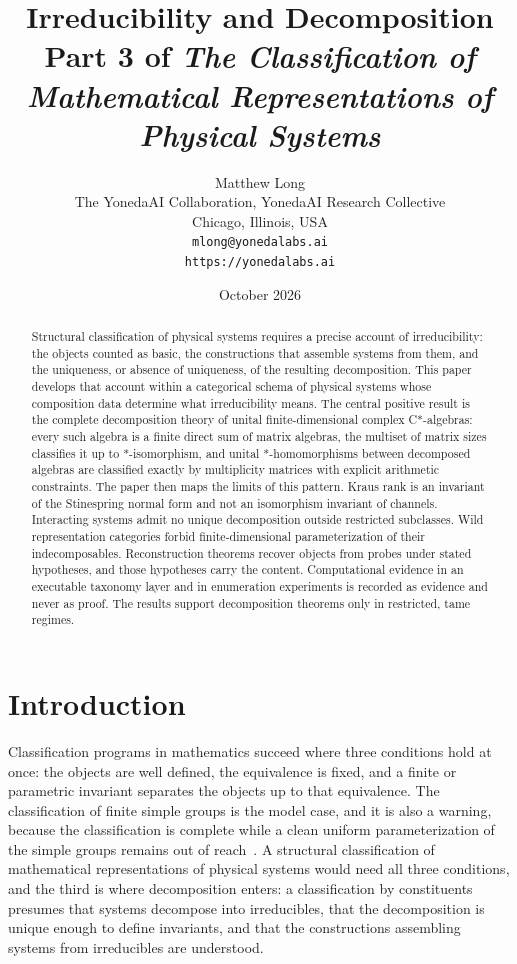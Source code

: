 \documentclass[11pt,letterpaper]{article}
\title{Irreducibility and Decomposition\\[4pt]
  {\normalsize Part 3 of \emph{The Classification of Mathematical Representations of Physical Systems}}}
\author{Matthew Long\\
  \small The YonedaAI Collaboration, YonedaAI Research Collective\\
  \small Chicago, Illinois, USA\\
  \small \texttt{mlong@yonedalabs.ai}\\
  \small \texttt{https://yonedalabs.ai}}
\date{October 2026}
\theoremstyle{definition}
\theoremstyle{remark}
\begin{document}
\maketitle

\begin{abstract}
Structural classification of physical systems requires a precise account of irreducibility: the objects counted as basic, the constructions that assemble systems from them, and the uniqueness, or absence of uniqueness, of the resulting decomposition. This paper develops that account within a categorical schema of physical systems whose composition data determine what irreducibility means. The central positive result is the complete decomposition theory of unital finite-dimensional complex C*-algebras: every such algebra is a finite direct sum of matrix algebras, the multiset of matrix sizes classifies it up to *-isomorphism, and unital *-homomorphisms between decomposed algebras are classified exactly by multiplicity matrices with explicit arithmetic constraints. The paper then maps the limits of this pattern. Kraus rank is an invariant of the Stinespring normal form and not an isomorphism invariant of channels. Interacting systems admit no unique decomposition outside restricted subclasses. Wild representation categories forbid finite-dimensional parameterization of their indecomposables. Reconstruction theorems recover objects from probes under stated hypotheses, and those hypotheses carry the content. Computational evidence in an executable taxonomy layer and in enumeration experiments is recorded as evidence and never as proof. The results support decomposition theorems only in restricted, tame regimes.
\end{abstract}

\section{Introduction}

Classification programs in mathematics succeed where three conditions hold at once: the objects are well defined, the equivalence is fixed, and a finite or parametric invariant separates the objects up to that equivalence. The classification of finite simple groups is the model case, and it is also a warning, because the classification is complete while a clean uniform parameterization of the simple groups remains out of reach~\cite{solomon}. A structural classification of mathematical representations of physical systems would need all three conditions, and the third is where decomposition enters: a classification by constituents presumes that systems decompose into irreducibles, that the decomposition is unique enough to define invariants, and that the constructions assembling systems from irreducibles are understood.
\end{document}
